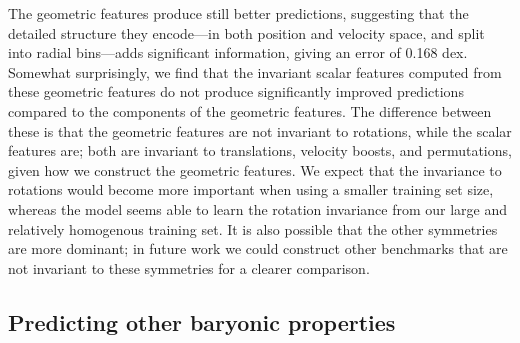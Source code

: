 The geometric features produce still better predictions, suggesting that the detailed structure they encode---in both position and velocity space, and split into radial bins---adds significant information, giving an error of 0.168 dex.
Somewhat surprisingly, we find that the invariant scalar features computed from these geometric features do not produce significantly improved predictions compared to the components of the geometric features.
The difference between these is that the geometric features are not invariant to rotations, while the scalar features are; both are invariant to translations, velocity boosts, and permutations, given how we construct the geometric features.
We expect that the invariance to rotations would become more important when using a smaller training set size, whereas the model seems able to learn the rotation invariance from our large and relatively homogenous training set.
It is also possible that the other symmetries are more dominant; in future work we could construct other benchmarks that are not invariant to these symmetries for a clearer comparison.


\subsection{Predicting other baryonic properties}
\label{sec:pred_galprops}

